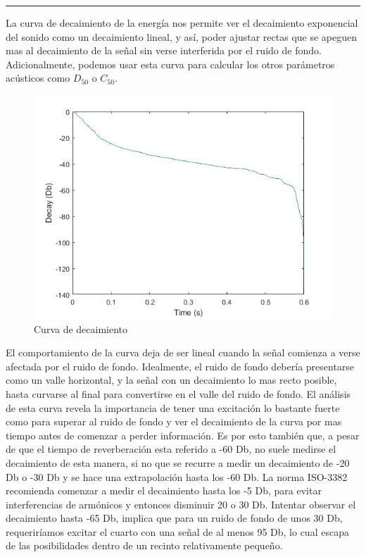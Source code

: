 \rule{\linewidth}{0.4pt}
La curva de decaimiento de la energía nos permite ver el decaimiento exponencial del sonido como un decaimiento lineal, y así, poder ajustar rectas que se apeguen mas al decaimiento de la señal sin verse interferida por el ruido de fondo. Adicionalmente, podemos usar esta curva para calcular los otros parámetros acústicos como $D_{50}$ o $C_{50}$.\hfill\break
\begin{figure}[!htb]
    \centering
    \includegraphics[width=\linewidth]{imagenes/DecayCurve_RIR_Analysis.jpg}
    \caption{\footnotesize Curva de decaimiento}
    \label{fig:DecayCurve}
\end{figure}
\FloatBarrier
El comportamiento de la curva deja de ser lineal cuando la señal comienza a verse afectada por el ruido de fondo. Idealmente, el ruido de fondo debería presentarse como un valle horizontal, y la señal con un decaimiento lo mas recto posible, hasta curvarse al final para convertirse en el valle del ruido de fondo. \hfill\break
El análisis de esta curva revela la importancia de tener una excitación lo bastante fuerte como para superar al ruido de fondo y ver el decaimiento de la curva por mas tiempo antes de comenzar a perder información. Es por esto también que, a pesar de que el tiempo de reverberación esta referido a -60 Db, no suele medirse el decaimiento de esta manera, si no que se recurre a medir un decaimiento de -20 Db o -30 Db y se hace una extrapolación hasta los -60 Db. La norma ISO-3382 recomienda comenzar a medir el decaimiento hasta los -5 Db, para evitar interferencias de armónicos y entonces disminuir 20 o 30 Db. Intentar observar el decaimiento hasta -65 Db, implica que para un ruido de fondo de unos 30 Db, requeriríamos excitar el cuarto con una señal de al menos 95 Db, lo cual escapa de las posibilidades dentro de un recinto relativamente pequeño.\hfill\break
